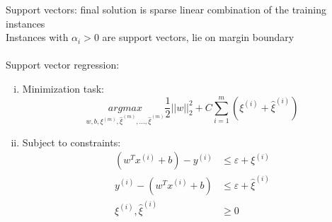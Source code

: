 \documentclass{article}
\begin{document}
			Support vectors: final solution is sparse linear combination of the training instances \\
			Instances with $\alpha_i > 0$ are support vectors, lie on margin boundary \\
			\\
			Support vector regression:
			\begin{enumerate}[(i)]
				\item Minimization task: 
				\begin{equation*}
					\underset{w, b, \xi^{(m)}, \hat{\xi}^{(m)}, ..., \hat{\xi}^{(m)}}{argmax} \frac{1}{2}||w||_2^2 + C\sum_{i = 1}^m\left(\xi^{(i)} + \hat{\xi}^{(i)}\right)
					\end{equation*}
				\item Subject to constraints:
				\begin{align*}
					(w^Tx^{(i)} + b) - y^{(i)} &\leq \varepsilon + \xi^{(i)} \\
					y^{(i)} - (w^Tx^{(i)} + b) &\leq \varepsilon + \hat{\xi}^{(i)} \\
					\xi^{(i)}, \hat{\xi}^{(i)} &\geq 0
					\end{align*}
				\end{enumerate}
\end{document}
